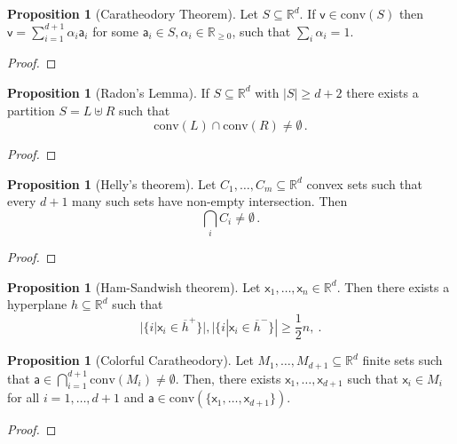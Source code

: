 \documentclass[12pt]{amsart}
\theoremstyle{definition}
\newtheorem{prop}[thm]{Proposition}
\newcommand{\R}{\mathbb{R}}
\newcommand{\vv}{\mathsf{v}}
\newcommand{\vx}{\mathsf{x}}
\newcommand{\va}{\mathsf{a}}
\newcommand{\conv}{\mathrm{conv}}
\begin{document}
\begin{prop}[Caratheodory Theorem]
Let $S \subseteq \R^d$.
If $\vv \in \conv (S)$ then $\vv = \sum_{i=1}^{d+1} \alpha_i \va_i$ for some $\va_i \in S, \alpha_i \in \R_{\geq 0}$, such that $\sum_i \alpha_i = 1$.
\end{prop}

\begin{proof}

\end{proof}



\begin{prop}[Radon's Lemma]
If $S\subseteq \R^d$ with $|S| \geq d+2$ there exists a partition $S = L \uplus R$ such that $$\conv (L) \cap \conv (R) \neq \emptyset \, .$$
\end{prop}


\begin{proof}

\end{proof}


\begin{prop}[Helly's theorem]
Let $C_1, \ldots , C_m \subseteq \R^d$ convex sets such that every $d+1$ many such sets have non-empty intersection.
Then 
$$\bigcap_i C_i \neq \emptyset \, . $$
\end{prop}

\begin{proof}

\end{proof}



\begin{prop}[Ham-Sandwish theorem]
Let $\vx_1 ,  \ldots , \vx_n \in \R^d$.
Then there exists a hyperplane $h \subseteq \R^d$ such that 
$$ |\{i | \vx_i \in \overline{h}^+\}| , |\{i | \vx_i \in \overline{h}^-\}| \geq \frac{1}{2} n,\ . $$
\end{prop}



\begin{prop}[Colorful Caratheodory]
Let $M_1, \ldots, M_{d+1} \subseteq \R^d$ finite sets such that $\va \in \bigcap_{i = 1}^{d+1} \conv (M_i) \neq \emptyset$.
Then, there exists $\vx_1, \dots, \vx_{d+1}$ such that $\vx_i \in M_i$ for all $i = 1, \ldots, d+1$ and $\va \in \conv (\{\vx_1, \ldots, \vx_{d+1}\})$.
\end{prop}

\begin{proof}

\end{proof}
\end{document}
